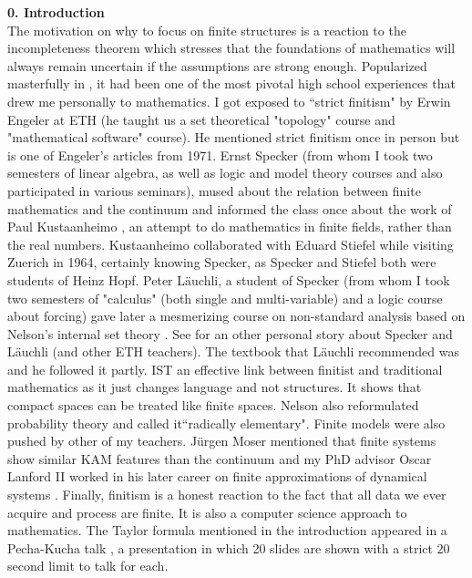 \documentclass[12pt]{amsart}
\begin{document}
{\bf 0. Introduction} \\

The motivation on why to focus on finite structures is a reaction to
the incompleteness theorem \cite{Goedel1940} which stresses that the foundations of mathematics will
always remain uncertain if the assumptions are strong enough. 
Popularized masterfully in \cite{Hofstadter}, it had been one of the most pivotal high school experiences that 
drew me personally to mathematics. I got exposed to ``strict finitism" by Erwin Engeler at ETH 
(he taught us a set theoretical "topology" course and "mathematical software" course). 
He mentioned strict finitism once in person but \cite{EnglerStrictFinitism} is one 
of Engeler's articles from 1971.
Ernst Specker (from whom I took two semesters of linear algebra, as well as
logic and model theory courses and also participated in various seminars), mused about the relation between finite
mathematics and the continuum and informed the class once about the work of Paul Kustaanheimo 
\cite{Kustaanheimo}, an attempt to do mathematics in finite fields, rather than the real numbers. Kustaanheimo
collaborated with Eduard Stiefel while visiting Zuerich in 1964, certainly knowing Specker, as Specker and Stiefel
both were students of Heinz Hopf. Peter L\"auchli, a student of Specker (from whom I took two semesters of 
"calculus" (both single and multi-variable) and a logic course about forcing) gave later a mesmerizing course on 
non-standard analysis based on Nelson's internal set theory \cite{Nelson77,Nelson}. See
\cite{GoldenRotations} for an other personal story about Specker and L\"auchli (and other ETH teachers).
The textbook that L\"auchli recommended was \cite{Robert} and he followed it partly.
IST an effective link between finitist and traditional mathematics
as it just changes language and not structures. It shows that compact spaces can be treated like finite spaces.
Nelson also reformulated probability theory \cite{Nelson} and called it``radically elementary". 
Finite models were also pushed by other of my teachers. J\"urgen Moser mentioned that finite systems show similar
KAM features than the continuum \cite{Ran74} and my PhD advisor
Oscar Lanford II worked in his later career on finite approximations of dynamical systems \cite{lanford98}.
Finally, finitism is a honest reaction to the fact that all 
data we ever acquire and process are finite. It is also a computer science approach to mathematics. 
The Taylor formula mentioned in the introduction appeared in a Pecha-Kucha talk \cite{ArchimedesFunctions},
a presentation in which 20 slides are shown with a strict $20$ second limit to talk for each.
\end{document}
